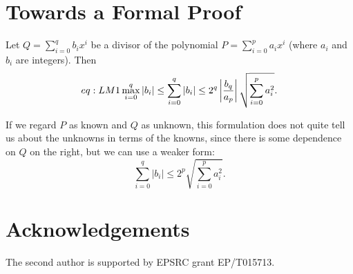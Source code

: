 \documentclass{llncs}
\begin{document}
\section{Towards a Formal Proof}
\begin{theorem}\label{thm:LM}
Let $Q = \sum_{i=0}^q{b_i x^i}$ be a divisor of the polynomial
$P=\sum_{i=0}^p{a_ix^i}$ (where $a_i$ and $b_i$ are integers). Then
\begin{equation}{eq:LM1}
\max_{i=0}^q\left\vert b_i \right\vert \le
\sum_{i=0}^q \left\vert b_i \right\vert \le
2^q \left\vert b_q \over a_p \right\vert \sqrt{\sum_{i=0}^p{a_i^2}} .
\end{equation}
\end{theorem}
\par
If we regard $P$ as known and $Q$ as unknown, this formulation does not quite
tell us about the unknowns in terms of the knowns, since there is some
dependence on $Q$ on the right, but we can use a weaker form:
\begin{equation}
\sum_{i=0}^q \left\vert b_i \right\vert \le
2^p \sqrt{\sum_{i=0}^p{a_i^2}} .
\end{equation}

\section*{Acknowledgements}The second author is supported by EPSRC grant EP/T015713.

\end{document}
